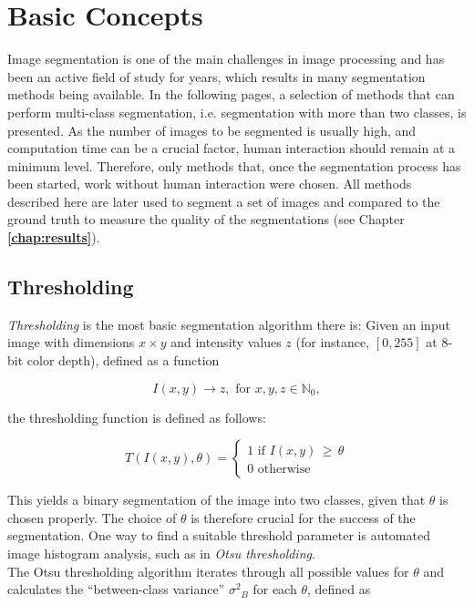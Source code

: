 \chapter{Basic Concepts}
\label{chap:concepts}

Image segmentation is one of the main challenges in image processing and has been an active field of study for years, which results in many segmentation methods being available. In the following pages, a selection of methods that can perform multi-class segmentation, i.e. segmentation with more than two classes, is presented. As the number of images to be segmented is usually high, and computation time can be a crucial factor, human interaction should remain at a minimum level. Therefore, only methods that, once the segmentation process has been started, work without human interaction were chosen. All methods described here are later used to segment a set of images and compared to the ground truth to measure the quality of the segmentations (see Chapter \textbf{\ref{chap:results}}).
	
	\section{Thresholding}
\label{sec:thresholding}

\textit{Thresholding} is the most basic segmentation algorithm there is: Given an input image with dimensions $x \times y$ and intensity values $z$ (for instance, $[0, 255]$ at 8-bit color depth), defined as a function

\[I(x, y) \to z, \text{ for } x, y, z \in \mathbb{N}_0,\]

\noindent the thresholding function is defined as follows:

\[ T(I(x, y), \theta) =  \begin{cases}
				1 \text{ if } I(x, y) \, \geq \, \theta \\
			           0 \text{ otherwise}
			     \end{cases}
\]


\noindent This yields a binary segmentation of the image into two classes, given that $\theta$ is chosen properly. The choice of $\theta$ is therefore crucial for the success of the segmentation. One way to find a suitable threshold parameter is automated image histogram analysis, such as in \textit{Otsu thresholding}.\\

\noindent The Otsu thresholding algorithm \cite{Otsu} iterates through all possible values for $\theta$ and calculates the ``between-class variance'' ${\sigma^{2}}_B$ for each $\theta$, defined as

